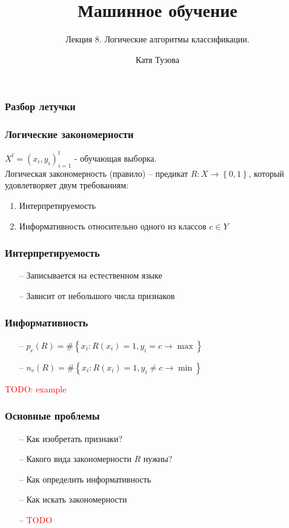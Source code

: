 \documentclass[12pt]{beamer}
\author{Катя Тузова}
\title{Машинное обучение}
\subtitle{Лекция 8. Логические алгоритмы классификации.}
\date{}
\begin{document}
	
\frame{\titlepage}

\begin{frame}\frametitle{Разбор летучки}

\end{frame}


\begin{frame}\frametitle{Логические закономерности}
${X^l = \left( x_i, y_i \right)_{i=1}^l}$ - обучающая выборка.\\
Логическая закономерность (правило) -- предикат ${R: X \rightarrow \left\{ 0, 1 \right\} }$, который удовлетворяет двум требованиям:\\
\begin{enumerate}
	\item Интерпретируемость
	\item Информативность относительно одного из классов ${c \in Y}$
\end{enumerate}
\end{frame}


\begin{frame}\frametitle{Интерпретируемость}
	\begin{itemize}
		\item[--] Записывается на естественном языке
		\item[--] Зависит от небольшого числа признаков
	\end{itemize}
\end{frame}

\begin{frame}\frametitle{Информативность}
	\begin{itemize}
		\item[--] ${ p_c(R) = \# \left\{ x_i: R(x_i) = 1 , y_i = c \rightarrow \max \right\} }$
		\item[--] ${ n_c(R) = \# \left\{ x_i: R(x_i) = 1 , y_i \neq c \rightarrow \min \right\} }$
	\end{itemize}
	\textcolor{red}{TODO: example}
\end{frame}

\begin{frame}\frametitle{Основные проблемы}
	\begin{itemize}
		\item[--] Как изобретать признаки? 
		\item[--] Какого вида закономерности $R$ нужны?
		\item[--] Как определить информативность		
		\item[--] Как искать закономерности		
		\item[--] \textcolor{red}{TODO}
	\end{itemize}
\end{frame}
\end{document}
